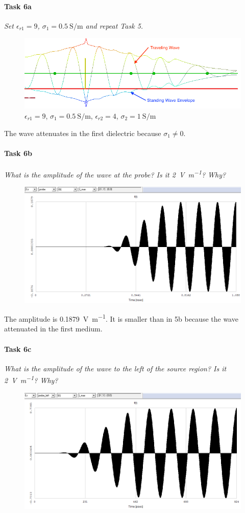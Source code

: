\paragraph{Task 6a} \textit{Set $\epsilon_{r1} = 9$, $\sigma_1 = \SI{0.5}{\siemens\per\meter}$ and repeat Task 5.}
\begin{figure}[tbph]
	\centering
	\includegraphics[width=0.96\linewidth]{graphics/Task2-6a-Standing}
	\caption{$\epsilon_{r1} = 9$, $\sigma_1 = \SI{0.5}{\siemens\per\meter}$, $\epsilon_{r2} = 4$, $\sigma_2 = \SI{1}{\siemens\per\meter}$}
	\label{fig:Task2-6a-Standing}
\end{figure}

The wave attenuates in the first dielectric because $\sigma_1 \ne 0$.

\paragraph{Task 6b} \textit{What is the amplitude of the wave at the probe? Is it \SI{2}{\volt\per\meter}? Why?}
\begin{figure}[tbph]
	\centering
	\includegraphics[width=0.6\linewidth]{graphics/Task2-6b-Amplitude}
\end{figure}

The amplitude is \SI{0.1879}{\volt\per\meter}.
It is smaller than in 5b because the wave attenuated in the first medium.

\pagebreak
\paragraph{Task 6c} \textit{What is the amplitude of the wave to the left of the source region? Is it \SI{2}{\volt\per\meter}? Why?}
\begin{figure}[tbph]
	\centering
	\includegraphics[width=0.6\linewidth]{graphics/Task2-6c-Amplitude_left}
\end{figure}

